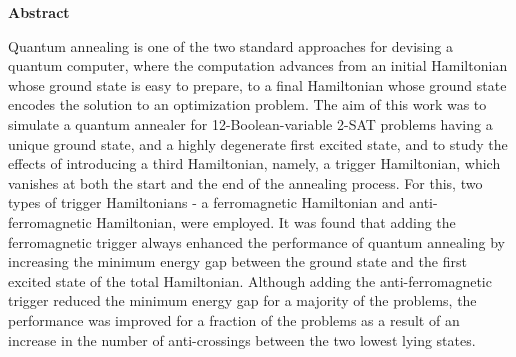 \documentclass[12]{article}
\begin{document}
\centering
\begin{Large}\textbf{Abstract}\\ \end{Large}
\vspace{0.5cm}
Quantum annealing is one of the two standard approaches for devising a quantum computer, where the computation advances from an initial Hamiltonian whose ground state is easy to prepare, to a final Hamiltonian whose ground state encodes the solution to an optimization problem. The aim of this work was to simulate a quantum annealer for 12-Boolean-variable 2-SAT problems having a unique ground state, and a highly degenerate first excited state, and to study the effects of introducing a third Hamiltonian, namely, a trigger Hamiltonian, which vanishes at both the start and the end of the annealing process. For this, two types of trigger Hamiltonians - a ferromagnetic Hamiltonian and anti-ferromagnetic Hamiltonian, were employed. It was found that adding the ferromagnetic trigger always enhanced the performance of quantum annealing by increasing the minimum energy gap between the ground state and the first excited state of the total Hamiltonian. Although adding the anti-ferromagnetic trigger reduced the minimum energy gap for a majority of the problems, the performance was improved for a fraction of the problems as a result of an increase in the number of anti-crossings between the two lowest lying states.
\end{document}
